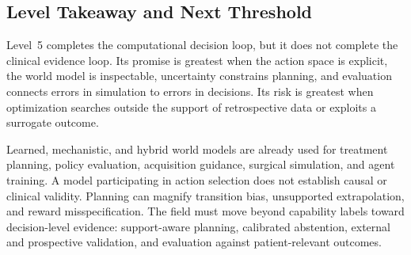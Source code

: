 \subsection{Level Takeaway and Next Threshold}

Level~5 completes the computational decision loop, but it does not complete the clinical evidence loop. Its promise is greatest when the action space is explicit, the world model is inspectable, uncertainty constrains planning, and evaluation connects errors in simulation to errors in decisions. Its risk is greatest when optimization searches outside the support of retrospective data or exploits a surrogate outcome.

\levelsummary
{Learned, mechanistic, and hybrid world models are already used for treatment planning, policy evaluation, acquisition guidance, surgical simulation, and agent training.}
{A model participating in action selection does not establish causal or clinical validity. Planning can magnify transition bias, unsupported extrapolation, and reward misspecification.}
{The field must move beyond capability labels toward decision-level evidence: support-aware planning, calibrated abstention, external and prospective validation, and evaluation against patient-relevant outcomes.}
